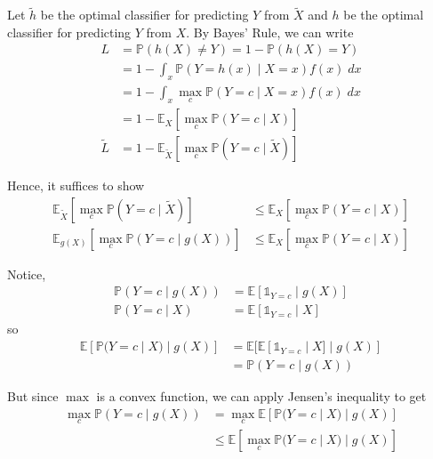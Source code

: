 \documentclass[11pt]{report}
\newcommand{\E}{\mathbb{E}}
\newcommand{\ind}{{\mathds{1}}}
\renewcommand{\P}{\mathbb{P}}
\begin{document}
\begin{enumerate}[1.]
\begin{enumerate}
		            \color{blue}
		            Let $\tilde h$ be the optimal classifier for predicting $Y$ from $\tilde X$ and $h$ be the optimal classifier for predicting $Y$ from $X$. By Bayes' Rule, we can write
		            \begin{align*}
			            L        & = \P(h(X) \neq Y) = 1 - \P(h(X) = Y)                   \\
			                     & = 1 - \int_x \P(Y = h(x) \; | \; X = x) f(x)\; dx      \\
			                     & = 1 - \int_x \max_c \P(Y = c \; | \; X = x) f(x)\; dx  \\
			                     & = 1 - \E_X[\max_c \P(Y = c \; | \; X)]                 \\
			            \tilde L & = 1 - \E_{\tilde X}[\max_c \P(Y = c \; | \; \tilde X)]
		            \end{align*}

		            Hence, it suffices to show
		            \begin{align*}
			            \E_{\tilde X} [\max_c \P(Y = c \; | \; \tilde X)] & \leq \E_{X} [\max_c \P(Y = c \; | \; X)] \\
			            \E_{g(X)} [\max_c \P(Y = c \; | \; g(X))]         & \leq \E_{X} [\max_c \P(Y = c \; | \; X)]
		            \end{align*}

		            Notice,
		            \begin{align*}
			            \P(Y = c \; | \; g(X)) & = \E[\ind_{Y = c} \; | \; g(X)] \\
			            \P(Y = c \; | \; X)    & = \E[\ind_{Y = c} \; | \; X]
		            \end{align*}
		            so
		            \begin{align*}
			            \E [\P(Y = c \; | \; X) \; | \; g(X)] & = \E[\E[\ind_{Y = c} \; | \; X] \; | \; g(X)] \\
			                                                  & = \P(Y = c \; | \; g(X))
		            \end{align*}

		            But since $\max$ is a convex function, we can apply Jensen's inequality to get
		            \begin{align*}
			            \max_c \P(Y = c \; | \; g(X)) & = \max_c \E[\P(Y = c \; | \; X) \; | \; g(X)]    \\
			                                          & \leq \E[\max_c \P(Y = c \; | \; X) \; | \; g(X)] \\
		            \end{align*}


\end{enumerate}
\end{enumerate}
\end{document}
